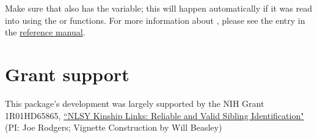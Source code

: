 \documentclass{article}\usepackage[]{graphicx}\usepackage[]{color}
\begin{document}
Make sure that  also has the  variable; this will happen automatically if it was read into \R{} using the  or  functions.  For more information about , please see the  entry in the \href{http://cran.r-project.org/web/packages/NlsyLinks/NlsyLinks.pdf}{reference manual}.



\section{Grant support}
This package's development was largely supported by the NIH Grant 1R01HD65865, \href{http://taggs.hhs.gov/AwardDetail.cfm?s_Award_Num=R01HD065865&n_Prog_Office_Code=50}{``NLSY Kinship Links: Reliable and Valid Sibling Identification"} (PI: Joe Rodgers; Vignette Construction by Will Beasley)
\end{document}

